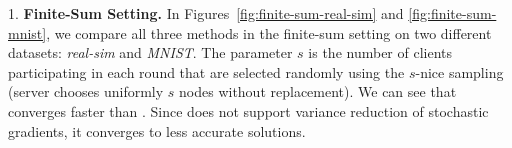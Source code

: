 \documentclass[10pt]{article}
\begin{document}
{1. \bf Finite-Sum Setting.} In Figures~\ref{fig:finite-sum-real-sim} and \ref{fig:finite-sum-mnist}, we compare all three methods in the finite-sum setting on two different datasets: \textit{real-sim} and \textit{MNIST}. The parameter $s$ is the number of clients participating in each round that are selected randomly using the $s$-nice sampling (server chooses uniformly $s$ nodes without replacement).
We can see that  converges faster than . Since  does not support variance reduction of stochastic gradients, it converges to less accurate solutions.
\vspace{-0.3cm}
\end{document}
